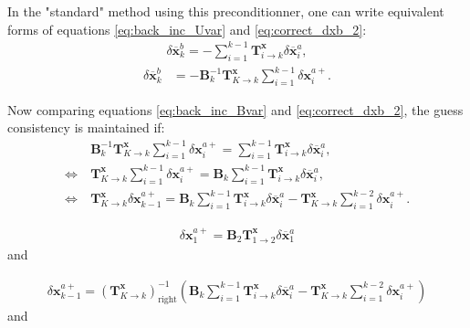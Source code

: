 \documentclass[npg, manuscript]{copernicus}
\begin{document}
In the "standard" method using this preconditionner, one can write equivalent forms of equations \eqref{eq:back_inc_Uvar} and \eqref{eq:correct_dxb_2}:
\begin{align}
\label{eq:back_inc_Bvar}
\delta \overline{\mathbf{x}}^b_k = - \sum_{i=1}^{k-1} \mathbf{T}^\mathbf{x}_{i \rightarrow k} \delta \overline{\mathbf{x}}^a_i,
\end{align}
\begin{align}
\label{eq:correct_dxb_2}
\delta \overline{\mathbf{x}}^b_k & = -\mathbf{B}^{-1}_k \mathbf{T}^\mathbf{x}_{K \rightarrow k} \sum_{i=1}^{k-1} \delta \mathbf{x}^{a+}_i.
\end{align}


Now comparing equations \eqref{eq:back_inc_Bvar} and \eqref{eq:correct_dxb_2}, the guess consistency is maintained if:
\begin{align}
\label{eq:general_condition_B}
& \mathbf{B}^{-1}_k \mathbf{T}^\mathbf{x}_{K \rightarrow k} \sum_{i=1}^{k-1} \delta \mathbf{x}^{a+}_i = \sum_{i=1}^{k-1} \mathbf{T}^\mathbf{x}_{i \rightarrow k} \delta \overline{\mathbf{x}}^a_i, \nonumber \\
\Leftrightarrow \ & \mathbf{T}^\mathbf{x}_{K \rightarrow k} \sum_{i=1}^{k-1} \delta \mathbf{x}^{a+}_i = \mathbf{B}_k \sum_{i=1}^{k-1} \mathbf{T}^\mathbf{x}_{i \rightarrow k} \delta \overline{\mathbf{x}}^a_i, \nonumber \\
 \Leftrightarrow \ & \boxed{\mathbf{T}^\mathbf{x}_{K \rightarrow k} \delta \mathbf{x}^{a+}_{k-1} =  \mathbf{B}_k \sum_{i=1}^{k-1} \mathbf{T}^\mathbf{x}_{i \rightarrow k} \delta \overline{\mathbf{x}}^a_i - \mathbf{T}^\mathbf{x}_{K \rightarrow k} \sum_{i=1}^{k-2} \delta \mathbf{x}^{a+}_i}.
\end{align}


\begin{align}
\label{eq:general_condition_B_K2}
\delta \mathbf{x}^{a+}_1 =  \mathbf{B}_2 \mathbf{T}^\mathbf{x}_{1 \rightarrow 2} \delta \overline{\mathbf{x}}^a_1
\end{align}
and

\begin{align}
\label{eq:general_condition_B_right_inverse}
\delta \mathbf{x}^{a+}_{k-1} =  \left(\mathbf{T}^\mathbf{x}_{K \rightarrow k}\right)^{-1}_\text{right} \left(\mathbf{B}_k \sum_{i=1}^{k-1} \mathbf{T}^\mathbf{x}_{i \rightarrow k} \delta \overline{\mathbf{x}}^a_i - \mathbf{T}^\mathbf{x}_{K \rightarrow k} \sum_{i=1}^{k-2} \delta \mathbf{x}^{a+}_i\right)
\end{align}
and
\end{document}
